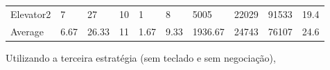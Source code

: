 ﻿\documentclass[a4paper]{article}
\begin{document}
\begin{table}[h]
\begin{tabular}{@{}llllllllll@{}}
Elevator2 & 7        & 27            & 10           & 1                                                               & 8                                                                  & 5005                                                         & 22029                                                 & 91533                                                   & 19.4         \\
Average   & 6.67     & 26.33         & 11        & 1.67                                                            & 9.33                                                               & 1936.67                                                         & 24743                                                 & 76107                                                   &  24.6         \\ \bottomrule
\end{tabular}
\end{table}

\newpage

Utilizando a terceira estratégia (sem teclado e sem negociação),
\end{document}
